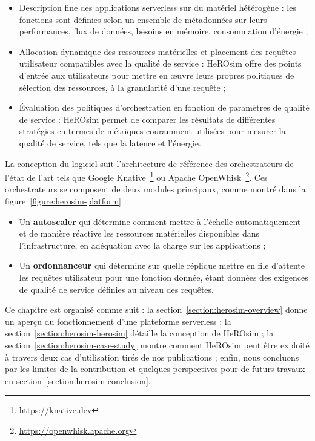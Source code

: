 \begin{itemize}
    \item Description fine des applications serverless sur du matériel hétérogène : les fonctions sont définies selon un ensemble de métadonnées sur leurs performances, flux de données, besoins en mémoire, consommation d'énergie ;
    \item Allocation dynamique des ressources matérielles et placement des requêtes utilisateur compatibles avec la qualité de service : HeROsim offre des points d'entrée aux utilisateurs pour mettre en œuvre leurs propres politiques de sélection des ressources, à la granularité d'une requête ;
    \item Évaluation des politiques d'orchestration en fonction de paramètres de qualité de service : HeROsim permet de comparer les résultats de différentes stratégies en termes de métriques couramment utilisées pour mesurer la qualité de service, tels que la latence et l'énergie.
\end{itemize}

La conception du logiciel suit l'architecture de référence des orchestrateurs de l'état de l'art tels que Google Knative~\footnote{\href{https://knative.dev}{https://knative.dev}} ou Apache OpenWhisk~\footnote{\href{https://openwhisk.apache.org}{https://openwhisk.apache.org}}. Ces orchestrateurs se composent de deux modules principaux, comme montré dans la figure~\ref{figure:herosim-platform} :

\begin{itemize}
    \item Un \textbf{autoscaler} qui détermine comment mettre à l'échelle automatiquement et de manière réactive les ressources matérielles disponibles dans l'infrastructure, en adéquation avec la charge sur les applications ;
    \item Un \textbf{ordonnanceur} qui détermine sur quelle réplique mettre en file d'attente les requêtes utilisateur pour une fonction donnée, étant données des exigences de qualité de service définies au niveau des requêtes.
\end{itemize}

Ce chapitre est organisé comme suit : la section~\ref{section:herosim-overview} donne un aperçu du fonctionnement d'une plateforme serverless ; la section~\ref{section:herosim-herosim} détaille la conception de HeROsim ; la section~\ref{section:herosim-case-study} montre comment HeROsim peut être exploité à travers deux cas d'utilisation tirés de nos publications ; enfin, nous concluons par les limites de la contribution et quelques perspectives pour de futurs travaux en section~\ref{section:herosim-conclusion}.

